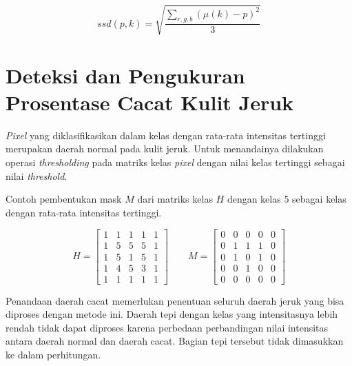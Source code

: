 \documentclass[laporan.tex]{subfiles}
\begin{document}
\begin{equation}
ssd(p,k) = \sqrt{\frac{\sum_{r,g,b} (\mu(k) - p)^2}{3}}
\end{equation}

\section{Deteksi dan Pengukuran Prosentase Cacat Kulit Jeruk}


\emph{Pixel} yang diklasifikasikan dalam kelas dengan rata-rata intensitas tertinggi merupakan daerah normal pada kulit jeruk. Untuk menandainya dilakukan operasi \emph{thresholding} pada matriks kelas \emph{pixel} dengan nilai kelas tertinggi sebagai nilai \emph{threshold}.

Contoh pembentukan mask $M$ dari matriks kelas $H$ dengan kelas 5 sebagai kelas dengan rata-rata intensitas tertinggi.

\begin{equation*}
H  = \begin{bmatrix}
1 & 1 & 1 & 1 & 1 \\
1 & 5 & 5 & 5 & 1 \\
1 & 5 & 1 & 5 & 1 \\
1 & 4 & 5 & 3 & 1 \\
1 & 1 & 1 & 1 & 1
\end{bmatrix} \qquad 
M  = \begin{bmatrix}
0 & 0 & 0 & 0 & 0 \\
0 & 1 & 1 & 1 & 0 \\
0 & 1 & 0 & 1 & 0 \\
0 & 0 & 1 & 0 & 0 \\
0 & 0 & 0 & 0 & 0
\end{bmatrix}
\end{equation*}


Penandaan daerah cacat memerlukan penentuan seluruh daerah jeruk yang bisa diproses dengan metode ini. Daerah tepi dengan kelas yang intensitasnya lebih rendah tidak dapat diproses karena perbedaan perbandingan nilai intensitas antara daerah normal dan daerah cacat. Bagian tepi tersebut tidak dimasukkan ke dalam perhitungan.
\end{document}

